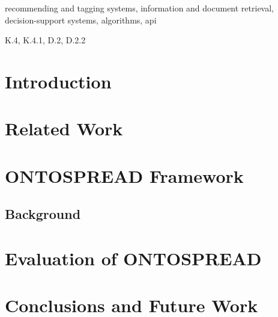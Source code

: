 \documentclass{article}[10pt]
\begin{document}
\begin{keywords}
recommending and tagging systems, information and document retrieval, decision-support systems, algorithms, api
\end{keywords}

\begin{category}
K.4, K.4.1, D.2, D.2.2
\end{category}

\section{Introduction}

\section{Related Work}\label{related-work}

\section{ONTOSPREAD Framework}
\subsection{Background}\label{background}


\section{Evaluation of ONTOSPREAD}

\section{Conclusions and Future Work}


% 
% 
% 
% 





\end{document}

